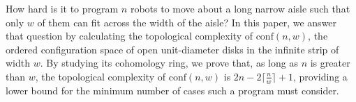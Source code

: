 How hard is it to program $n$ robots to move about a long narrow aisle such that only $w$ of them can fit across the width of the aisle?
In this paper, we answer that question by calculating the topological complexity of $\text{conf}(n,w)$, the ordered configuration space of open unit-diameter disks in the infinite strip of width $w$.
By studying its cohomology ring, we prove that, as long as $n$ is greater than $w$, the topological complexity of $\text{conf}(n,w)$ is $2n-2\big\lceil\frac{n}{w}\big\rceil+1$, providing a lower bound for the minimum number of cases such a program must consider.